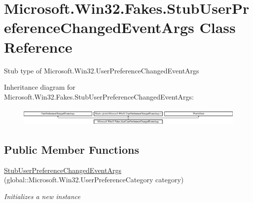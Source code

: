 \hypertarget{class_microsoft_1_1_win32_1_1_fakes_1_1_stub_user_preference_changed_event_args}{\section{Microsoft.\-Win32.\-Fakes.\-Stub\-User\-Preference\-Changed\-Event\-Args Class Reference}
\label{class_microsoft_1_1_win32_1_1_fakes_1_1_stub_user_preference_changed_event_args}
}


Stub type of Microsoft.\-Win32.\-User\-Preference\-Changed\-Event\-Args 


Inheritance diagram for Microsoft.\-Win32.\-Fakes.\-Stub\-User\-Preference\-Changed\-Event\-Args\-:\begin{figure}[H]
\begin{center}
\leavevmode
\includegraphics[height=0.919540cm]{class_microsoft_1_1_win32_1_1_fakes_1_1_stub_user_preference_changed_event_args}
\end{center}
\end{figure}
\subsection*{Public Member Functions}
\begin{DoxyCompactItemize}
\item 
\hyperlink{class_microsoft_1_1_win32_1_1_fakes_1_1_stub_user_preference_changed_event_args_a52dbb8eca42a299f6ed0351e8878943a}{Stub\-User\-Preference\-Changed\-Event\-Args} (global\-::\-Microsoft.\-Win32.\-User\-Preference\-Category category)
\begin{DoxyCompactList}\small\item\em Initializes a new instance\end{DoxyCompactList}\end{DoxyCompactItemize}
